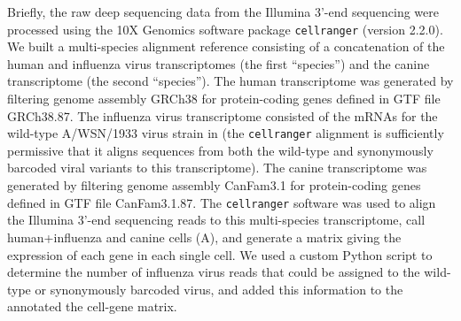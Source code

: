 \documentclass[9pt,lineno]{template}
\begin{document}
Briefly, the raw deep sequencing data from the Illumina 3'-end sequencing were processed using the 10X Genomics software package \texttt{cellranger} (version 2.2.0). 
We built a multi-species alignment reference consisting of a concatenation of the human and influenza virus transcriptomes (the first ``species'') and the canine transcriptome (the second ``species''). 
The human transcriptome was generated by filtering genome assembly GRCh38 for protein-coding genes defined in GTF file GRCh38.87.
The influenza virus transcriptome consisted of the mRNAs for the wild-type A/WSN/1933 virus strain in  (the \texttt{cellranger} alignment is sufficiently permissive that it aligns sequences from both the wild-type and synonymously barcoded viral variants to this transcriptome).
The canine transcriptome was generated by filtering genome assembly CanFam3.1 for protein-coding genes defined in GTF file CanFam3.1.87.
The \texttt{cellranger} software was used to align the Illumina 3'-end sequencing reads to this multi-species transcriptome, call human+influenza and canine cells (A), and generate a matrix giving the expression of each gene in each single cell.
We used a custom Python script to determine the number of influenza virus reads that could be assigned to the wild-type or synonymously barcoded virus, and added this information to the annotated the cell-gene matrix.
\end{document}
